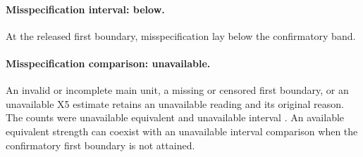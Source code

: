 \paragraph{Misspecification interval: below.}
At the released first boundary,  misspecification  lay below the confirmatory band.

\paragraph{Misspecification comparison: unavailable.}
An invalid or incomplete main unit, a missing or censored first boundary, or an unavailable X5 estimate retains an unavailable reading and its original reason.
The counts were  unavailable equivalent  and  unavailable interval .
An available equivalent strength can coexist with an unavailable interval comparison when the confirmatory first boundary is not attained.
























